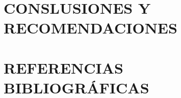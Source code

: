 \documentclass[12pt,a4paper]{report}
\begin{document}
\chapter{CONSLUSIONES Y RECOMENDACIONES}
\clearpage

\label{cap:conclusiones}

\chapter*{REFERENCIAS BIBLIOGRÁFICAS}
\clearpage
\printbibliography
{}

\appendix

\end{document}
